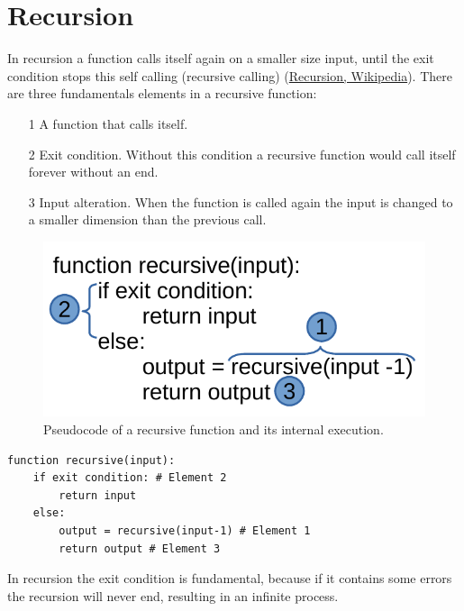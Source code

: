 \section{Recursion}
In recursion a function calls itself again on a smaller size input, until the exit condition stops this self calling (recursive calling) \cite{wikirecursion} (\href{https://en.wikipedia.org/wiki/Recursion_(computer_science)}{Recursion, Wikipedia}). There are three fundamentals elements in a recursive function:
\begin{itemize}
\item[1] A function that calls itself.
\item[2] Exit condition. Without this condition a recursive function would call itself forever without an end.
\item[3] Input alteration. When the function is called again the input is changed to a smaller dimension than the previous call.
\end{itemize}

\begin{figure}[hb]
	\begin{center}
		\includegraphics[scale=.6]{chapters/introduction/images/recursion_1.pdf}
		\caption[Pseudocode of a recursive function and its internal execution.]{Pseudocode of a recursive function and its internal execution.}
		\label{fig:recursion_1}
	\end{center}
\end{figure}

\begin{lstlisting}[numbers=none, caption={Pseudocode of a recursive function and its internal execution.}]
function recursive(input):
	if exit condition: # Element 2
		return input
	else:
		output = recursive(input-1) # Element 1
		return output # Element 3
\end{lstlisting}

In recursion the exit condition is fundamental, because if it contains some errors the recursion will never end, resulting in an infinite process.

